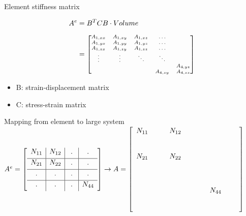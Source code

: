 \documentclass[screen]{beamer}
\begin{document}
\begin{frame}
Element stiffness matrix

\begin{align*}
A^e &= B^T C B \cdot Volume \\[0.5em]
 &= \scriptsize
\begin{bmatrix}
A_{1,xx} & A_{1,xy} & A_{1,xz} &\hdots & \\
A_{1,yx} & A_{1,yy} & A_{1,yz} &\hdots & \\
A_{1,zx} & A_{1,zy} & A_{1,zz} &\hdots & \\
\vdots & \vdots & \ddots & \ddots & \\
& & & & A_{4,yz} \\
 & & & A_{4,zy} & A_{4,zz}
\end{bmatrix}  
\end{align*}
\begin{itemize}
\item B: strain-displacement matrix
\item C: stress-strain matrix
\end{itemize}
\end{frame}

\begin{frame}
Mapping from element to large system
\\[1em]
\scriptsize
$
A^e = \left[
\begin{array}{c|c|c|c}
  {N_{11}} & N_{12} & \, \, . \, \, & . \\[0.3em] \hline
  N_{21} & N_{22} & . & . \\[0.3em] \hline
  . & . & . & . \\[0.3em] \hline
  . & . & . & N_{44}\\[0.3em]
\end{array} \right] \rightarrow
A = \left[
\begin{array}{c c c c c c c c c c}
N_{11} &  &  & N_{12} &  & & & & &\\
\\
\\
N_{21} & & & N_{22} \\
\\
\\
\\
 & & & & & & &   N_{44}\\
\\
\\
\end{array}\right]
$

\end{frame}
\end{document}
